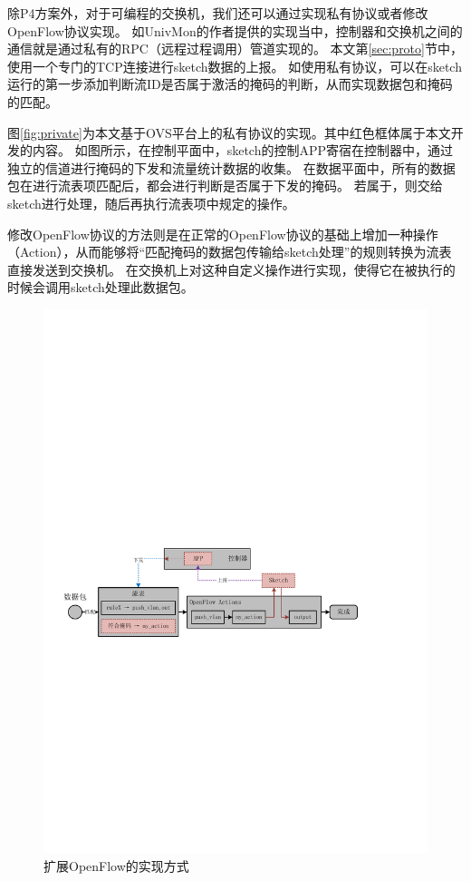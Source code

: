 除P4方案外，对于可编程的交换机，我们还可以通过实现私有协议或者修改OpenFlow协议实现。
如UnivMon\cite{liu2016one}的作者提供的实现当中，控制器和交换机之间的通信就是通过私有的RPC（远程过程调用）管道实现的。
本文第\ref{sec:proto}节中，使用一个专门的TCP连接进行sketch数据的上报。
如使用私有协议，可以在sketch运行的第一步添加判断流ID是否属于激活的掩码的判断，从而实现数据包和掩码的匹配。

图\ref{fig:private}为本文基于OVS平台上的私有协议的实现。其中红色框体属于本文开发的内容。
如图所示，在控制平面中，sketch的控制APP寄宿在控制器中，通过独立的信道进行掩码的下发和流量统计数据的收集。
在数据平面中，所有的数据包在进行流表项匹配后，都会进行判断是否属于下发的掩码。
若属于，则交给sketch进行处理，随后再执行流表项中规定的操作。

修改OpenFlow协议的方法则是在正常的OpenFlow协议的基础上增加一种操作（Action），从而能够将“匹配掩码的数据包传输给sketch处理”的规则转换为流表直接发送到交换机。
在交换机上对这种自定义操作进行实现，使得它在被执行的时候会调用sketch处理此数据包。

\begin{figure}[ht]
	\centering
	\includegraphics[width=\textwidth]{fig/ofaction.pdf}
	\caption{扩展OpenFlow的实现方式}
	\label{fig:ofaction}
\end{figure}

